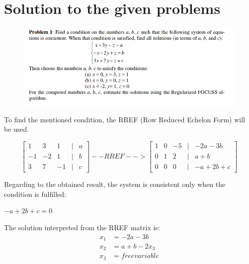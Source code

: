 \documentclass[eng,openany]{mgr}
\author{Jaroslaw M. Szumega}
\title{}
\date{25.04.2017}
\begin{document}
\maketitle
\tableofcontents
\chapter{Solution to the given problems}
\begin{figure}[h]
\centering
\includegraphics[width=0.8\linewidth]{screenshot001}
\label{fig:screenshot001}
\end{figure}
To find the mentioned condition, the RREF (Row Reduced Echelon Form) will be used.


\[
\begin{bmatrix}
1 & 3 & 1  &| & a\\
-1 & -2 & 1&| & b\\
3 & 7 & -1 &| & c
\end{bmatrix}
-- RREF -->
\begin{bmatrix}
1 & 0 & -5  &| & -2a -3b\\
0 & 1 & 2&| & a + b\\
0 & 0 & 0 &| & -a + 2b + c
\end{bmatrix}
\]

Regarding to the obtained result, the system is  consistent only when the condition is fulfilled:
\begin{center}
$-a + 2b + c = 0$
\end{center}

The solution interpreted from the RREF 
matrix is:
\begin{align}
x_1 &= -2a - 3b\nonumber\\
x_2 &=   a + b - 2x_3\nonumber\\
x_3 &= free variable \nonumber
\end{align}
\end{document}
